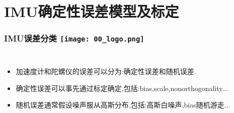 \section{IMU确定性误差模型及标定}

\begin{comment}
\end{comment}
\begin{frame}
\frametitle{IMU误差分类 \hfill \texttt{[image: 00\_logo.png]}}
\begin{columns}
  
	\begin{itemize}
		\item 加速度计和陀螺仪的误差可以分为:{\color{red}确定性误差}和{\color{red}随机误差}.
		\item 确定性误差可以事先通过标定确定,包括:bias,scale,nonorthogonality...
		\item 随机误差通常假设噪声服从高斯分布,包括:高斯白噪声,bias随机游走...
  \end{itemize}
  
  

\end{columns}
\end{frame}


